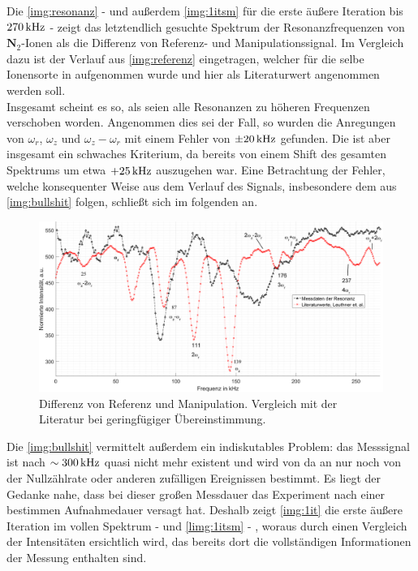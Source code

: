 \documentclass[numbers=noenddot,a4paper,notitlepage,twoside,BCOR15mm]{scrartcl}
\newcommand{\fett}[1]{\textbf{#1}}
\begin{document}
		Die \autoref{img:resonanz} - und außerdem \autoref{img:1itsm} für die erste äußere Iteration bis $\unit[270]{kHz}$ - zeigt das letztendlich gesuchte Spektrum der Resonanzfrequenzen von $\fett{N}_2$-Ionen als die Differenz von Referenz- und Manipulationssignal.  Im Vergleich dazu ist der Verlauf aus \autoref{img:referenz} eingetragen, welcher für die selbe Ionensorte in \cite{Paul-FalleREF} aufgenommen wurde und hier als Literaturwert angenommen werden soll.\\
		Insgesamt scheint es so, als seien alle Resonanzen zu höheren Frequenzen verschoben worden. Angenommen dies sei der Fall, so wurden die Anregungen von $\omega_r$, $\omega_z$ und $\omega_z-\omega_r$ mit einem Fehler von $\pm\unit[20]{kHz}$ gefunden. Die ist aber insgesamt ein schwaches Kriterium, da bereits von einem Shift des gesamten Spektrums um etwa $+\unit[25]{kHz}$ auszugehen war. Eine Betrachtung der Fehler, welche konsequenter Weise aus dem Verlauf des Signals, insbesondere dem aus \autoref{img:bullshit} folgen, schließt sich im folgenden an.
		
		\begin{figure}
			\includegraphics[width=\textwidth]{pics/freq_diff_vergleich.png}
			\caption{Differenz von Referenz und Manipulation. Vergleich mit der Literatur \cite{Paul-FalleREF} bei geringfügiger Übereinstimmung.}\label{img:resonanz}
		\end{figure}
		
		Die \autoref{img:bullshit} vermittelt außerdem ein indiskutables Problem: das Messsignal ist nach $\sim\unit[300]{kHz}$ quasi nicht mehr existent und wird von da an nur noch von der Nullzählrate oder anderen zufälligen Ereignissen bestimmt. Es liegt der Gedanke nahe, dass bei dieser großen Messdauer das Experiment nach einer bestimmen Aufnahmedauer versagt hat. Deshalb zeigt \autoref{img:1it} die erste äußere Iteration im vollen Spektrum  - und \autoref{limg:1itsm} - , woraus durch einen Vergleich der Intensitäten ersichtlich wird, das bereits dort die vollständigen Informationen der Messung enthalten sind.
		
\end{document}
